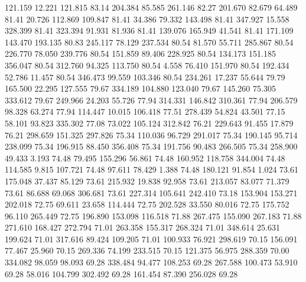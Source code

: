  121.159   12.221  121.815        83.14
 204.384   85.585  261.146        82.27
 201.670   82.679   64.489        81.41
  20.726  112.869  109.847        81.41
  34.386   79.332  143.498        81.41
 347.927   15.558  328.399        81.41
 323.394   91.931   81.936        81.41
 139.076  165.949   41.541        81.41
 171.109  143.470  193.135        80.83
 245.117   78.129  237.534        80.54
  81.570   55.711  285.867        80.54
 226.770   78.050  239.776        80.54
 151.859   89.406  228.925        80.54
 134.173  151.185  356.047        80.54
 312.760   94.325  113.750        80.54
   4.558   76.410  151.970        80.54
 192.434   52.786   11.457        80.54
 346.473   99.559  103.346        80.54
 234.261   17.237   55.644        79.79
 165.500   22.295  127.555        79.67
 334.189  104.880  123.040        79.67
 145.260   75.305  333.612        79.67
 249.966   24.203   55.726        77.94
 314.331  146.842  310.361        77.94
 206.579   98.328   63.274        77.94
 114.447   10.015  106.418        77.51
 278.439   54.824   43.501        77.15
  58.101   93.823  335.302        77.08
  73.022  105.124  312.842        76.21
 229.643   91.455   17.879        76.21
 298.659  151.325  297.826        75.34
 110.036   96.729  291.017        75.34
 190.145   95.714  238.099        75.34
 196.915   88.450  356.408        75.34
 191.756   90.483  266.505        75.34
 258.900   49.433    3.193        74.48
  79.495  155.296   56.861        74.48
 160.952  118.758  344.004        74.48
 114.585    9.815  107.721        74.48
  97.611   78.429    1.388        74.48
 180.121   91.854    1.024        73.61
 175.048   37.437   85.129        73.61
 215.932   19.838   92.958        73.61
 213.057   83.077   71.379        73.61
  86.688   69.068  306.681        73.61
 227.314  105.641  242.410        73.18
 153.904  153.271  202.018        72.75
  69.611   23.658  114.444        72.75
 202.528   33.550   80.016        72.75
 175.752   96.110  265.449        72.75
 196.890  153.098  116.518        71.88
 267.475  155.090  267.183        71.88
 271.610  168.427  272.794        71.01
 263.358  155.317  268.324        71.01
 348.614   25.631  199.624        71.01
 317.616   89.424  109.205        71.01
 100.933   76.921  298.619        70.15
 156.091   77.467   25.960        70.15
 269.336   74.199  233.515        70.15
 121.375   56.975  288.359        70.00
 334.082   98.059   98.093        69.28
 338.484   94.477  108.253        69.28
 267.588  100.473   53.910        69.28
  58.016  104.799  302.492        69.28
 161.454   87.390  256.028        69.28
